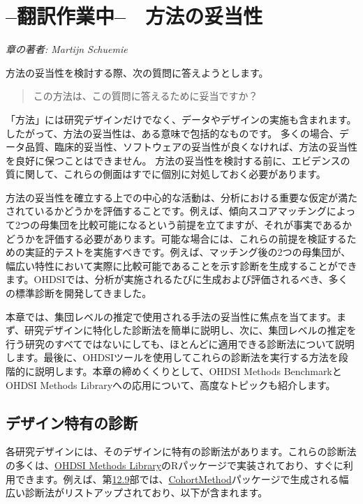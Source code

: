\documentclass[
  11pt]{book}
\theoremstyle{definition}
\theoremstyle{definition}
\theoremstyle{definition}
\theoremstyle{definition}
\theoremstyle{remark}
\begin{document}
\chapter{--翻訳作業中--　方法の妥当性}\label{MethodValidity}


\emph{章の著者: Martijn Schuemie}

方法の妥当性を検討する際、次の質問に答えようとします。

\begin{quote}
この方法は、この質問に答えるために妥当ですか？
\end{quote}

「方法」には研究デザインだけでなく、データやデザインの実施も含まれます。したがって、方法の妥当性は、ある意味で包括的なものです。 多くの場合、データ品質、臨床的妥当性、ソフトウェアの妥当性が良くなければ、方法の妥当性を良好に保つことはできません。 方法の妥当性を検討する前に、エビデンスの質に関して、これらの側面はすでに個別に対処しておく必要があります。

方法の妥当性を確立する上での中心的な活動は、分析における重要な仮定が満たされているかどうかを評価することです。例えば、傾向スコアマッチングによって2つの母集団を比較可能になるという前提を立てますが、それが事実であるかどうかを評価する必要があります。可能な場合には、これらの前提を検証するための実証的テストを実施すべきです。例えば、マッチング後の2つの母集団が、幅広い特性において実際に比較可能であることを示す診断を生成することができます。OHDSIでは、分析が実施されるたびに生成および評価されるべき、多くの標準診断を開発してきました。

本章では、集団レベルの推定で使用される手法の妥当性に焦点を当てます。まず、研究デザインに特化した診断法を簡単に説明し、次に、集団レベルの推定を行う研究のすべてではないにしても、ほとんどに適用できる診断法について説明します。最後に、OHDSIツールを使用してこれらの診断法を実行する方法を段階的に説明します。本章の締めくくりとして、OHDSI Methods BenchmarkとOHDSI Methods Libraryへの応用について、高度なトピックも紹介します。

\section{デザイン特有の診断}\label{ux30c7ux30b6ux30a4ux30f3ux7279ux6709ux306eux8a3aux65ad}


各研究デザインには、そのデザインに特有の診断法があります。これらの診断法の多くは、\href{https://ohdsi.github.io/MethodsLibrary/}{OHDSI Methods Library}のRパッケージで実装されており、すぐに利用できます。例えば、第\href{https://ohdsi.github.io/TheBookOfOhdsi/PopulationLevelEstimation.html\#studyOutputs}{12.9}部では、\href{https://ohdsi.github.io/CohortMethod/}{CohortMethod}パッケージで生成される幅広い診断法がリストアップされており、以下が含まれます。
\end{document}
